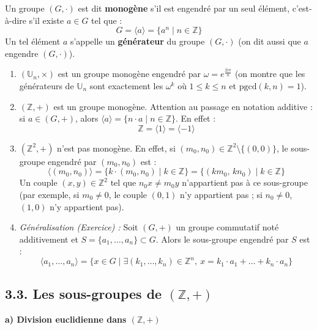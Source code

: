 \documentclass[a4paper,11pt]{article}
\newcommand{\Z}{\mathbb{Z}}
\newcommand{\U}{\mathbb{U}}
\newcommand{\mot}[1]{\textcolor{bordeaux}{\textbf{#1}}}
\begin{document}
\begin{definition}
Un groupe $(G, \cdot)$ est dit \mot{monogène} s'il est engendré par un seul élément, c'est-à-dire s'il existe $a \in G$ tel que :
\[
G = \langle a \rangle = \{ a^n \mid n \in \Z \}
\]
Un tel élément $a$ s'appelle un \mot{générateur} du groupe $(G, \cdot)$ (on dit aussi que $a$ engendre $(G, \cdot)$).
\end{definition}

\begin{exemples}
\begin{enumerate}
    \item $(\U_n, \times)$ est un groupe monogène engendré par $\omega = e^{\frac{2i\pi}{n}}$ (on montre que les générateurs de $\U_n$ sont exactement les $\omega^k$ où $1 \le k \le n$ et $\mathrm{pgcd}(k, n) = 1$).
    
    \item $(\Z, +)$ est un groupe monogène. Attention au passage en notation additive : si $a \in (G, +)$, alors $\langle a \rangle = \{ n \cdot a \mid n \in \Z \}$. En effet :
    \[
    \Z = \langle 1 \rangle = \langle -1 \rangle
    \]
    
    \item $(\Z^2, +)$ n'est pas monogène. En effet, si $(m_0, n_0) \in \Z^2 \setminus \{(0, 0)\}$, le sous-groupe engendré par $(m_0, n_0)$ est :
    \[
    \langle (m_0, n_0) \rangle = \{ k \cdot (m_0, n_0) \mid k \in \Z \} = \{ (k m_0, \, k n_0) \mid k \in \Z \}
    \]
    Un couple $(x, y) \in \Z^2$ tel que $n_0 x \neq m_0 y$ n'appartient pas à ce sous-groupe (par exemple, si $m_0 \neq 0$, le couple $(0, 1)$ n'y appartient pas ; si $n_0 \neq 0$, $(1, 0)$ n'y appartient pas).
    
    \item \textit{Généralisation (Exercice) :} Soit $(G, +)$ un groupe commutatif noté additivement et $S = \{a_1, \dots, a_n\} \subset G$. Alors le sous-groupe engendré par $S$ est :
    \[
    \langle a_1, \dots, a_n \rangle = \{ x \in G \mid \exists (k_1, \dots, k_n) \in \Z^n, \ x = k_1 \cdot a_1 + \dots + k_n \cdot a_n \}
    \]
\end{enumerate}
\end{exemples}

\newpage
\subsection{3.3. Les sous-groupes de $(\Z, +)$}

\textbf{a) Division euclidienne dans $(\Z, +)$}
\end{document}
